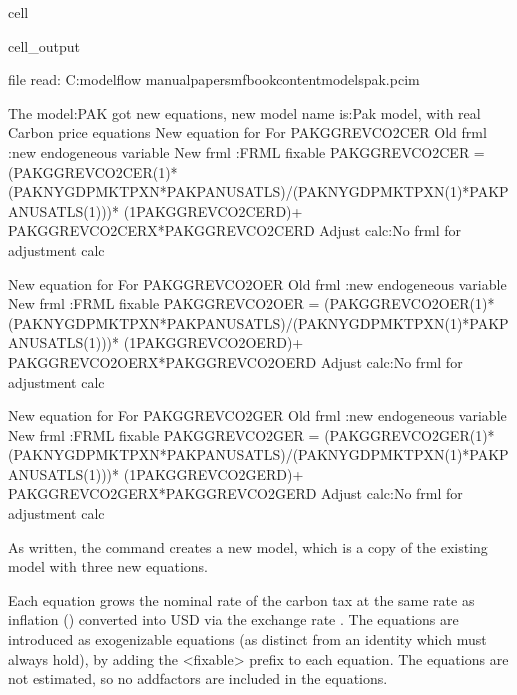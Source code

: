 \documentclass[letterpaper,10pt,english]{jupyterBook}
\begin{document}
\begin{sphinxuseclass}{cell}
\begin{sphinxVerbatimOutput}
\begin{sphinxuseclass}{cell_output}
\begin{sphinxVerbatim}[commandchars=\\\{\}]
file read:  C:\PYGZbs{}modelflow manual\PYGZbs{}papers\PYGZbs{}mfbook\PYGZbs{}content\PYGZbs{}models\PYGZbs{}pak.pcim
\end{sphinxVerbatim}

\begin{sphinxVerbatim}[commandchars=\\\{\}]
The model:\PYGZdq{}PAK\PYGZdq{} got new equations, new model name is:\PYGZdq{}Pak model, with real Carbon price equations\PYGZdq{}
New equation for For PAKGGREVCO2CER
Old frml   :new endogeneous variable 
New frml   :FRML \PYGZlt{}fixable\PYGZgt{} PAKGGREVCO2CER = (PAKGGREVCO2CER(\PYGZhy{}1)*(PAKNYGDPMKTPXN*PAKPANUSATLS)/(PAKNYGDPMKTPXN(\PYGZhy{}1)*PAKPANUSATLS(\PYGZhy{}1)))* (1\PYGZhy{}PAKGGREVCO2CER\PYGZus{}D)+ PAKGGREVCO2CER\PYGZus{}X*PAKGGREVCO2CER\PYGZus{}D\PYGZdl{}
Adjust calc:No frml for adjustment calc  

New equation for For PAKGGREVCO2OER
Old frml   :new endogeneous variable 
New frml   :FRML \PYGZlt{}fixable\PYGZgt{} PAKGGREVCO2OER = (PAKGGREVCO2OER(\PYGZhy{}1)*(PAKNYGDPMKTPXN*PAKPANUSATLS)/(PAKNYGDPMKTPXN(\PYGZhy{}1)*PAKPANUSATLS(\PYGZhy{}1)))* (1\PYGZhy{}PAKGGREVCO2OER\PYGZus{}D)+ PAKGGREVCO2OER\PYGZus{}X*PAKGGREVCO2OER\PYGZus{}D\PYGZdl{}
Adjust calc:No frml for adjustment calc  

New equation for For PAKGGREVCO2GER
Old frml   :new endogeneous variable 
New frml   :FRML \PYGZlt{}fixable\PYGZgt{} PAKGGREVCO2GER = (PAKGGREVCO2GER(\PYGZhy{}1)*(PAKNYGDPMKTPXN*PAKPANUSATLS)/(PAKNYGDPMKTPXN(\PYGZhy{}1)*PAKPANUSATLS(\PYGZhy{}1)))* (1\PYGZhy{}PAKGGREVCO2GER\PYGZus{}D)+ PAKGGREVCO2GER\PYGZus{}X*PAKGGREVCO2GER\PYGZus{}D\PYGZdl{}
Adjust calc:No frml for adjustment calc  
\end{sphinxVerbatim}

\end{sphinxuseclass}\end{sphinxVerbatimOutput}

\end{sphinxuseclass}
\sphinxAtStartPar
As written, the  command creates a new model, which is a copy of the existing model with three new equations.

\sphinxAtStartPar
Each equation grows the nominal rate of the carbon tax at the same rate as inflation () converted into USD via the exchange rate . The equations are introduced as exogenizable equations (as distinct from an identity which must always hold), by adding the <fixable> prefix to each equation. The equations are not estimated, so no add\sphinxhyphen{}factors are included in the equations.
\end{document}
